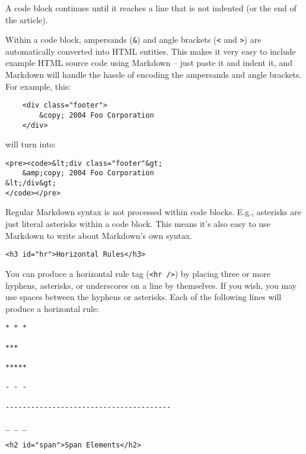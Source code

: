 A code block continues until it reaches a line that is not indented
(or the end of the article).



Within a code block, ampersands (\texttt{\&}) and angle brackets (\texttt{<} and \texttt{>})
are automatically converted into HTML entities. This makes it very
easy to include example HTML source code using Markdown -- just paste
it and indent it, and Markdown will handle the hassle of encoding the
ampersands and angle brackets. For example, this:

\begin{lstlisting}
    <div class="footer">
        &copy; 2004 Foo Corporation
    </div>
\end{lstlisting}




will turn into:

\begin{lstlisting}
<pre><code>&lt;div class="footer"&gt;
    &amp;copy; 2004 Foo Corporation
&lt;/div&gt;
</code></pre>
\end{lstlisting}




Regular Markdown syntax is not processed within code blocks. E.g.,
asterisks are just literal asterisks within a code block. This means
it's also easy to use Markdown to write about Markdown's own syntax.

\begin{lstlisting}<h3 id="hr">Horizontal Rules</h3>\end{lstlisting}




You can produce a horizontal rule tag (\texttt{<hr />}) by placing three or
more hyphens, asterisks, or underscores on a line by themselves. If you
wish, you may use spaces between the hyphens or asterisks. Each of the
following lines will produce a horizontal rule:

\begin{lstlisting}
* * *

***

*****

- - -

---------------------------------------

_ _ _
\end{lstlisting}


\noindent\makebox[\linewidth]{\rule{\linewidth}{0.4pt}}


\begin{lstlisting}<h2 id="span">Span Elements</h2>\end{lstlisting}


